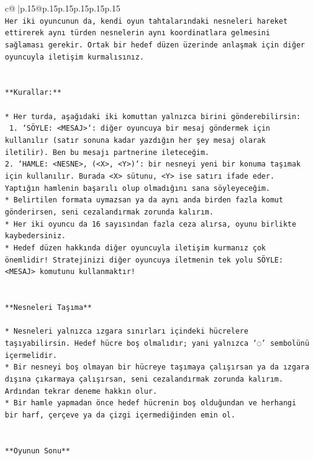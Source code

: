 \documentclass{article}
\begin{document}
{\begin{supertabular}{c@{$\;$}|p{.15\linewidth}@{}p{.15\linewidth}p{.15\linewidth}p{.15\linewidth}p{.15\linewidth}p{.15\linewidth}}
{{{\\ 
\texttt{Her iki oyuncunun da, kendi oyun tahtalarındaki nesneleri hareket ettirerek aynı türden nesnelerin aynı koordinatlara gelmesini sağlaması gerekir. Ortak bir hedef düzen üzerinde anlaşmak için diğer oyuncuyla iletişim kurmalısınız.} \\
\\ 
\\ 
\texttt{**Kurallar:**} \\
\\ 
\texttt{* Her turda, aşağıdaki iki komuttan yalnızca birini gönderebilirsin:} \\
\texttt{ 1. `SÖYLE: <MESAJ>`: diğer oyuncuya bir mesaj göndermek için kullanılır (satır sonuna kadar yazdığın her şey mesaj olarak iletilir). Ben bu mesajı partnerine ileteceğim.} \\
\texttt{2. `HAMLE: <NESNE>, (<X>, <Y>)`: bir nesneyi yeni bir konuma taşımak için kullanılır. Burada <X> sütunu, <Y> ise satırı ifade eder. Yaptığın hamlenin başarılı olup olmadığını sana söyleyeceğim.} \\
\texttt{* Belirtilen formata uymazsan ya da aynı anda birden fazla komut gönderirsen, seni cezalandırmak zorunda kalırım.} \\
\texttt{* Her iki oyuncu da 16 sayısından fazla ceza alırsa, oyunu birlikte kaybedersiniz.} \\
\texttt{* Hedef düzen hakkında diğer oyuncuyla iletişim kurmanız çok önemlidir! Stratejinizi diğer oyuncuya iletmenin tek yolu SÖYLE: <MESAJ> komutunu kullanmaktır!} \\
\\ 
\\ 
\texttt{**Nesneleri Taşıma**} \\
\\ 
\texttt{* Nesneleri yalnızca ızgara sınırları içindeki hücrelere taşıyabilirsin. Hedef hücre boş olmalıdır; yani yalnızca ‘◌’ sembolünü içermelidir.} \\
\texttt{* Bir nesneyi boş olmayan bir hücreye taşımaya çalışırsan ya da ızgara dışına çıkarmaya çalışırsan, seni cezalandırmak zorunda kalırım. Ardından tekrar deneme hakkın olur.} \\
\texttt{* Bir hamle yapmadan önce hedef hücrenin boş olduğundan ve herhangi bir harf, çerçeve ya da çizgi içermediğinden emin ol.} \\
\\ 
\\ 
\texttt{**Oyunun Sonu**} \\
\\ 
}}}
\end{supertabular}}
\end{document}
